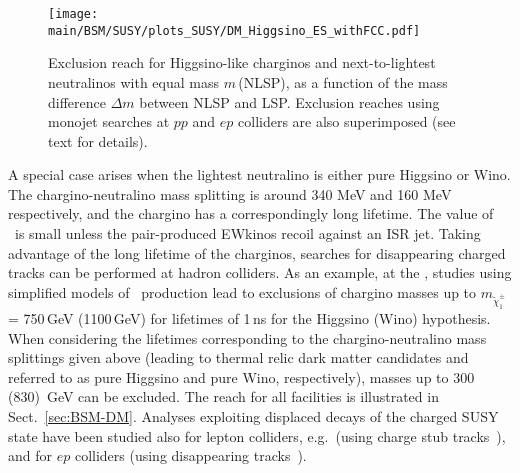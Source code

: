 \documentclass[../report.tex]{subfiles}
\providecommand{\main}{..}
\begin{document}
\begin{figure}[htb]
    \centering
\texttt{[image: \\main/BSM/SUSY/plots\_SUSY/DM\_Higgsino\_ES\_withFCC.pdf]}
    \caption{
    Exclusion reach for Higgsino-like charginos and next-to-lightest neutralinos with equal mass $m\,$(NLSP), as a function of the mass difference $\Delta m$ between NLSP and LSP. Exclusion reaches using monojet searches at $pp$ and $ep$ colliders are also superimposed (see text for details).}
\label{fig:SUSY_Higgsinos}
\end{figure}
A special case arises when the lightest neutralino is either pure Higgsino or Wino. The chargino-neutralino mass splitting is around 340 MeV and 160 MeV respectively, and the chargino has a correspondingly long lifetime. The value of \Ptmiss~is small unless the pair-produced EWkinos recoil against an ISR jet. Taking advantage of the long lifetime of the charginos, searches for disappearing charged tracks can be performed at hadron colliders. As an example, at the \HLLHC, studies using simplified models of \chiOnePM~production lead to exclusions of chargino masses up to $m_{{\tilde \chi}_1^\pm}$ = 750\,GeV (1100\,GeV) for lifetimes of 1\,ns for the Higgsino (Wino) hypothesis. When considering the lifetimes corresponding to the chargino-neutralino mass splittings given above (leading to thermal relic dark matter candidates and referred to as pure Higgsino and pure Wino, respectively), masses up to 300 (830)~GeV can be excluded. The reach for all facilities is illustrated in Sect.~\ref{sec:BSM-DM}. Analyses exploiting displaced decays of the charged SUSY state have been studied also for lepton colliders, e.g.\ \CLICThreeThousand (using charge stub tracks~\cite{deBlas:2018mhx}), and for $ep$ colliders (using disappearing tracks~\cite{Curtin2018}).  
\end{document}

